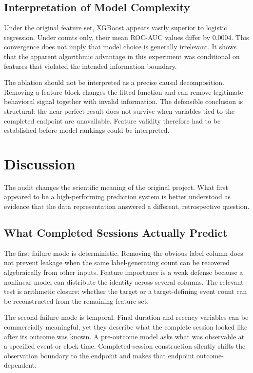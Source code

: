 \documentclass[conference, letterpaper]{IEEEtran}
\begin{document}
\subsection{Interpretation of Model Complexity}
Under the original feature set, XGBoost appears vastly superior to logistic regression. Under counts only, their mean ROC-AUC values differ by 0.0004. This convergence does not imply that model choice is generally irrelevant. It shows that the apparent algorithmic advantage in this experiment was conditional on features that violated the intended information boundary.

The ablation should not be interpreted as a precise causal decomposition. Removing a feature block changes the fitted function and can remove legitimate behavioral signal together with invalid information. The defensible conclusion is structural: the near-perfect result does not survive when variables tied to the completed endpoint are unavailable. Feature validity therefore had to be established before model rankings could be interpreted.

\section{Discussion}
The audit changes the scientific meaning of the original project. What first appeared to be a high-performing prediction system is better understood as evidence that the data representation answered a different, retrospective question.

\subsection{What Completed Sessions Actually Predict}
The first failure mode is deterministic. Removing the obvious label column does not prevent leakage when the same label-generating count can be recovered algebraically from other inputs. Feature importance is a weak defense because a nonlinear model can distribute the identity across several columns. The relevant test is arithmetic closure: whether the target or a target-defining event count can be reconstructed from the remaining feature set.

The second failure mode is temporal. Final duration and recency variables can be commercially meaningful, yet they describe what the complete session looked like after its outcome was known. A pre-outcome model asks what was observable at a specified event or clock time. Completed-session construction silently shifts the observation boundary to the endpoint and makes that endpoint outcome-dependent.
\end{document}
